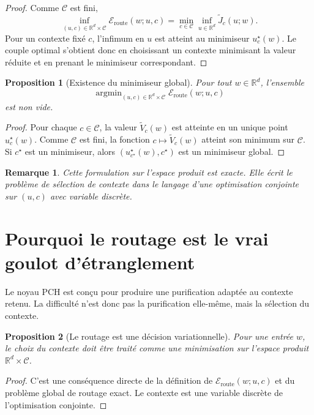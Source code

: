 \documentclass[11pt,a4paper]{article}
\newtheorem{proposition}{Proposition}[section]
\newtheorem{remark}{Remarque}[section]
\DeclareMathOperator{\argmin}{argmin}
\newcommand{\R}{\mathbb R}
\newcommand{\Ccal}{\mathcal C}
\begin{document}
\begin{proof}
Comme \(\Ccal\) est fini,
\[
\inf_{(u,c)\in \R^d\times\Ccal}\mathcal E_{\mathrm{route}}(w;u,c)
=
\min_{c\in\Ccal}\inf_{u\in\R^d}\widetilde J_c(u;w).
\]
Pour un contexte fixé \(c\), l'infimum en \(u\) est atteint au minimiseur \(u_c^\star(w)\). Le couple optimal s'obtient donc en choisissant un contexte minimisant la valeur réduite et en prenant le minimiseur correspondant.
\end{proof}

\begin{proposition}[Existence du minimiseur global]
Pour tout \(w\in\R^d\), l'ensemble
\[
\argmin_{(u,c)\in \R^d\times\Ccal}\mathcal E_{\mathrm{route}}(w;u,c)
\]
est non vide.
\end{proposition}

\begin{proof}
Pour chaque \(c\in\Ccal\), la valeur \(\widetilde V_c(w)\) est atteinte en un unique point \(u_c^\star(w)\). Comme \(\Ccal\) est fini, la fonction \(c\mapsto \widetilde V_c(w)\) atteint son minimum sur \(\Ccal\). Si \(c^\star\) est un minimiseur, alors \((u_{c^\star}^\star(w),c^\star)\) est un minimiseur global.
\end{proof}

\begin{remark}
Cette formulation sur l'espace produit est exacte. Elle écrit le problème de sélection de contexte dans le langage d'une optimisation conjointe sur \((u,c)\) avec variable discrète.
\end{remark}

\section{Pourquoi le routage est le vrai goulot d'étranglement}

Le noyau PCH est conçu pour produire une purification adaptée au contexte retenu. La difficulté n'est donc pas la purification elle-même, mais la sélection du contexte.

\begin{proposition}[Le routage est une décision variationnelle]
Pour une entrée \(w\), le choix du contexte doit être traité comme une minimisation sur l'espace produit \(\R^d\times\Ccal\).
\end{proposition}

\begin{proof}
C'est une conséquence directe de la définition de \(\mathcal E_{\mathrm{route}}(w;u,c)\) et du problème global de routage exact. Le contexte est une variable discrète de l'optimisation conjointe.
\end{proof}
\end{document}
